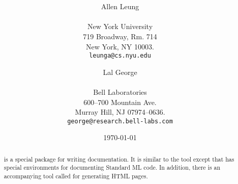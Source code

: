 \documentclass{article}
\begin{document}
   \title{\bf \LARGE \MLTeX} 
   \author{\begin{tabular}{c}
            Allen Leung \\ \\
            New York University \\
            719 Broadway, Rm. 714 \\ 
            New York, NY 10003. \\
            {\tt leunga@cs.nyu.edu}
           \end{tabular}
        \and 
           \begin{tabular}{c}
            Lal George \\ \\
            Bell Laboratories \\
            600--700 Mountain Ave. \\
            Murray Hill, NJ 07974--0636. \\
            {\tt george@research.bell-labs.com}
            \end{tabular}
     }

   \date{\today}
   

   \maketitle

   \begin{abstract}
 \newdef{\MLTeX} is a special \newdef{\LaTeX} package for writing
\MLRISC{} documentation.  It is similar to the 
tool except that \MLTeX{} has special environments for documenting
Standard ML code.   In addition, there is an accompanying tool
called  for generating HTML pages.
   \end{abstract}
 

   
   
\end{document}
